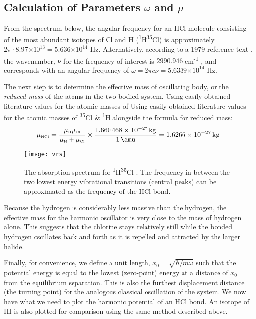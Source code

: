 \documentclass[11pt]{article}
\providecommand{\e}[1]{\ensuremath{\times 10^{#1}}}
\begin{document}
\subsection{Calculation of Parameters $\omega$ and $\mu$}
From the spectrum below, the angular frequency for an HCl molecule consisting of the most abundant isotopes of Cl and H (\textsuperscript{1}H\textsuperscript{35}Cl) is approximately $2\pi\cdot 8.97\e{13}=5.636\e{14}$ Hz\cite{RefWorks:1}. Alternatively, according to a 1979 reference text \cite{RefWorks:2}, the wavenumber, $\nu$ for the frequency of interest is $2990.946$ cm\textsuperscript{-1} , and corresponds with an angular frequency of $\omega = 2\pi c\nu = 5.6339\e{14}$ Hz.

The next step is to determine the effective mass of oscillating body, or the \textit{reduced mass} of the atoms in the two-bodied system. Using easily obtained literature values for the atomic masses of 
Using easily obtained literature values for the atomic masses of \textsuperscript{35}Cl \& \textsuperscript{1}H alongside the formula for reduced mass:
\begin{equation}
\mu_{\text{\tiny\HCl}} = \frac{\mu_{\text{\tiny\Hy}}\mu_{\text{\tiny\Cl}}}{\mu_{\text{\tiny\Hy}}+\mu_{\text{\tiny\Cl}}} \times \frac{\SI{1.660468d-27}{\kilo\gram}}{\SI{1}{\amu}} = \SI{1.6266d-27}{\kilo\gram}
\end{equation}

\begin{figure}[b!]
\begin{center}
\texttt{[image: vrs]}
\caption[V/R spec]{The absorption spectrum for \textsuperscript{1}H\textsuperscript{35}Cl \cite{RefWorks:1}. The frequency in between the two lowest energy vibrational transitions (central peaks) can be approximated as the frequency of the HCl bond.}
\label{fig:vrs}
\end{center}
\end{figure}

Because the hydrogen is considerably less massive than the hydrogen, the effective mass for the harmonic oscillator is very close to the mass of hydrogen alone. This suggests that the chlorine stays relatively still while the bonded hydrogen oscillates back and forth as it is repelled and attracted by the larger halide.

Finally, for convenience, we define a unit length, $x_{0} = \sqrt{\hbar/m\omega}$ such that the potential energy is equal to the lowest (zero-point) energy at a distance of $x_{0}$ from the equilibrium separation. This is also the furthest displacement distance (the turning point) for the analogous classical oscillation of the system. We now have what we need to plot the harmonic potential of an HCl bond. An isotope of HI is also plotted for comparison using the same method described above.
\end{document}
